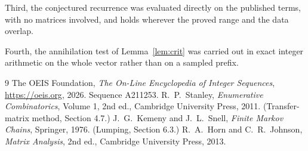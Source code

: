 \documentclass[11pt,a4paper]{article}
\theoremstyle{plain}
\theoremstyle{definition}
\begin{document}
Third, the conjectured recurrence was evaluated directly on the published terms, with no
matrices involved, and holds wherever the proved range and the data overlap.

Fourth, the annihilation test of Lemma~\ref{lem:crit} was carried out in exact integer
arithmetic on the whole vector rather than on a sampled prefix.

\begin{thebibliography}{9}
 The OEIS Foundation, \emph{The On-Line Encyclopedia of Integer
Sequences}, \url{https://oeis.org}, 2026. Sequence A211253.
 R.~P.~Stanley, \emph{Enumerative Combinatorics}, Volume 1, 2nd ed.,
Cambridge University Press, 2011. (Transfer-matrix method, Section 4.7.)
 J.~G.~Kemeny and J.~L.~Snell, \emph{Finite Markov Chains}, Springer, 1976.
(Lumping, Section 6.3.)
 R.~A.~Horn and C.~R.~Johnson, \emph{Matrix Analysis}, 2nd ed., Cambridge
University Press, 2013.
\end{thebibliography}
\end{document}
